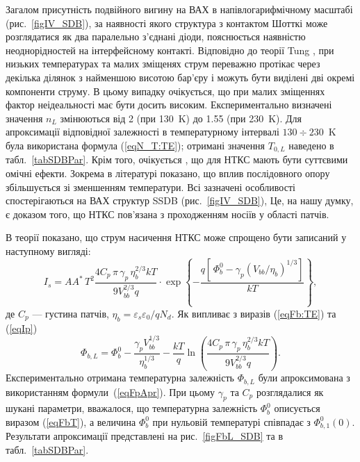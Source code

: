 Загалом присутність подвійного вигину на ВАХ в напівлогарифмічному масштабі (рис.~\ref{figIV_SDB}),
за наявності якого структура з контактом Шотткі може розглядатися як два паралельно з'єднані діоди, пояснюється наявністю неоднорідностей на інтерфейсному контакті.
Відповідно до теорії Tung \cite{Tung:PhysRev,Tung:MSE},
при низьких температурах та малих зміщенях струм переважно протікає через декілька ділянок з найменшою висотою бар'єру і можуть бути виділені дві окремі компоненти струму.
В цьому випадку очікується, що при малих зміщеннях фактор неідеальності має бути досить високим.
Експериментально визначені значення $n_L$ змінюються від 2 (при 130~K) до 1.55 (при 230~K).
Для апроксимації відповідної залежності в температурному інтервалі $130\div230$~K була використана формула (\ref{eqN_T:TE});
отримані значення $T_{0,L}$ наведено в табл.~\ref{tabSDBPar}.
Крім того, очікується \cite{Tung:PhysRev,Tung:MSE}, що для НТКС мають бути суттєвими омічні ефекти.
Зокрема в літературі  \cite{Gammon2013} показано, що вплив послідовного опору збільшується зі зменшенням температури.
Всі зазначені особливості спостерігаються на ВАХ структур SSDB (рис.~\ref{figIV_SDB}),
Це, на нашу думку, є доказом того, що НТКС пов'язана з проходженням носіїв у області патчів.


В теорії \cite{Tung:PhysRev} показано, що струм насичення НТКС може спрощено бути записаний у наступному вигляді:
\begin{equation}
\label{eqIp}
I_s=AA^*\,T^2\frac{4C_p\,\pi\,\gamma_p\,\eta_b^{2/3}kT}{9V_{bb}^{2/3}q}\cdot
\exp\left\{-\frac{q\left[\,\Phi_{b}^0-\gamma_p (V_{bb}/\eta_b)^{1/3}\right]}{kT}\right\},
\end{equation}
де
$C_p$ --- густина патчів,
$\eta_{b}=\varepsilon_s\varepsilon_0/qN_d$.
Як випливає з виразів (\ref{eqFb:TE}) та (\ref{eqIp})
\begin{equation}
\label{eqFpApr}
\Phi_{b,L}=\Phi_{b}^0-\frac{\gamma_p V_{bb}^{1/3}}{\eta_b^{1/3}} -\frac{kT}{q}\ln\left(\frac{4C_p\,\pi\,\gamma_p\,\eta_b^{2/3}kT}{9V_{bb}^{2/3}q}\right).
\end{equation}
Експериментально отримана температурна залежність $\Phi_{b,L}$ були апроксимована з використанням формули~(\ref{eqFpApr}).
При цьому $\gamma_p$ та $C_p$ розглядалися як шукані параметри,
вважалося, що температурна залежність $\Phi_{b}^0$ описується виразом (\ref{eqFbT}), а величина $\Phi_{b}^0$ при нульовій температурі
співпадає з $\Phi_{b,1}^0(0)$.
Результати апроксимації представлені на рис.~\ref{figFbL_SDB} та в табл.~\ref{tabSDBPar}.

